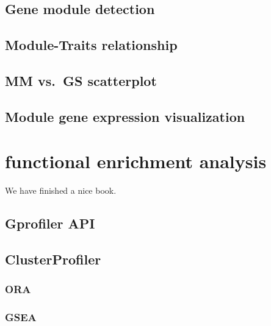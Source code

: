 \documentclass[
  a4paper,
  oneside]{book}
\begin{document}
\hypertarget{gene-module-detection}{%
\section{Gene module detection}\label{gene-module-detection}}

\hypertarget{module-traits-relationship}{%
\section{Module-Traits relationship}\label{module-traits-relationship}}

\hypertarget{mm-vs.-gs-scatterplot}{%
\section{MM vs.~GS scatterplot}\label{mm-vs.-gs-scatterplot}}

\hypertarget{module-gene-expression-visualization}{%
\section{Module gene expression visualization}\label{module-gene-expression-visualization}}

\hypertarget{functional-enrichment-analysis}{%
\chapter{functional enrichment analysis}\label{functional-enrichment-analysis}}

We have finished a nice book.

\hypertarget{gprofiler-api}{%
\section{Gprofiler API}\label{gprofiler-api}}

\hypertarget{clusterprofiler}{%
\section{ClusterProfiler}\label{clusterprofiler}}

\hypertarget{ora}{%
\subsection{ORA}\label{ora}}

\hypertarget{gsea}{%
\subsection{GSEA}\label{gsea}}
\end{document}

